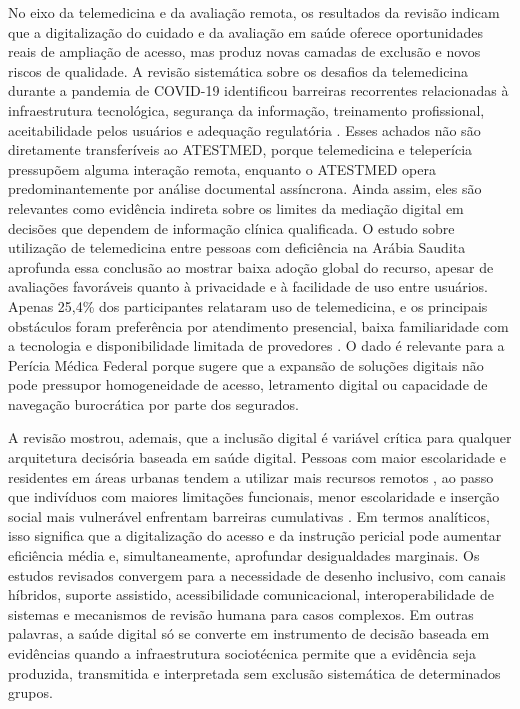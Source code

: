\documentclass[12pt,a4paper]{article}
\begin{document}
No eixo da telemedicina e da avaliação remota, os resultados da revisão indicam que a digitalização do cuidado e da avaliação em saúde oferece oportunidades reais de ampliação de acesso, mas produz novas camadas de exclusão e novos riscos de qualidade. A revisão sistemática sobre os desafios da telemedicina durante a pandemia de COVID-19 identificou barreiras recorrentes relacionadas à infraestrutura tecnológica, segurança da informação, treinamento profissional, aceitabilidade pelos usuários e adequação regulatória \parencite{ftouni2022challengesoftelemedicineduringthecovid19pandemica}. Esses achados não são diretamente transferíveis ao ATESTMED, porque telemedicina e teleperícia pressupõem alguma interação remota, enquanto o ATESTMED opera predominantemente por análise documental assíncrona. Ainda assim, eles são relevantes como evidência indireta sobre os limites da mediação digital em decisões que dependem de informação clínica qualificada. O estudo sobre utilização de telemedicina entre pessoas com deficiência na Arábia Saudita aprofunda essa conclusão ao mostrar baixa adoção global do recurso, apesar de avaliações favoráveis quanto à privacidade e à facilidade de uso entre usuários. Apenas 25,4\% dos participantes relataram uso de telemedicina, e os principais obstáculos foram preferência por atendimento presencial, baixa familiaridade com a tecnologia e disponibilidade limitada de provedores \parencite{albasheer2026telemedicineutilizationanddigitalinclusionamongpe}. O dado é relevante para a Perícia Médica Federal porque sugere que a expansão de soluções digitais não pode pressupor homogeneidade de acesso, letramento digital ou capacidade de navegação burocrática por parte dos segurados.

A revisão mostrou, ademais, que a inclusão digital é variável crítica para qualquer arquitetura decisória baseada em saúde digital. Pessoas com maior escolaridade e residentes em áreas urbanas tendem a utilizar mais recursos remotos \parencite{albasheer2026telemedicineutilizationanddigitalinclusionamongpe}, ao passo que indivíduos com maiores limitações funcionais, menor escolaridade e inserção social mais vulnerável enfrentam barreiras cumulativas \parencite{m2024astudyofdisabilityseveritybarriersandfacilitatingfactor, gao2019disabilityconcentrationandaccesstorehabilitationservice, mackett2025ametareviewofliteraturereviewsofdisabilitytravel}. Em termos analíticos, isso significa que a digitalização do acesso e da instrução pericial pode aumentar eficiência média e, simultaneamente, aprofundar desigualdades marginais. Os estudos revisados convergem para a necessidade de desenho inclusivo, com canais híbridos, suporte assistido, acessibilidade comunicacional, interoperabilidade de sistemas e mecanismos de revisão humana para casos complexos. Em outras palavras, a saúde digital só se converte em instrumento de decisão baseada em evidências quando a infraestrutura sociotécnica permite que a evidência seja produzida, transmitida e interpretada sem exclusão sistemática de determinados grupos.
\end{document}
